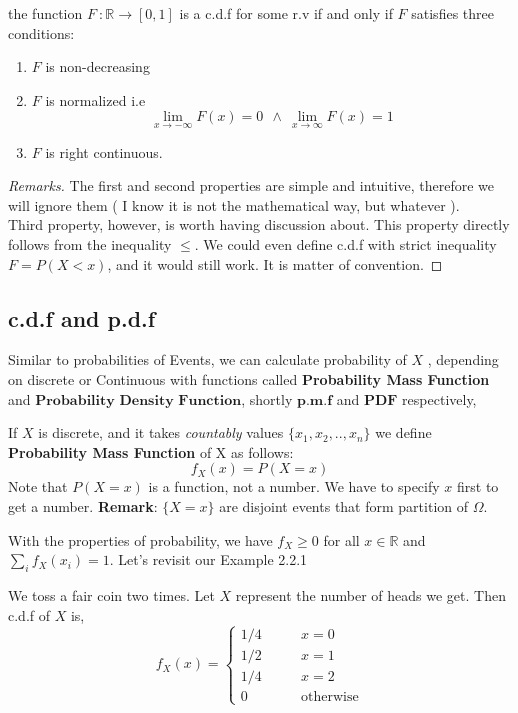 \begin{theorem}
    the function $F \ : \mathbb{R} \rightarrow [0,1]$ is a c.d.f for some r.v if and only if $F$ satisfies three conditions:
    \begin{enumerate}
        \item $F$ is non-decreasing
        \item $F$ is normalized i.e \[ \lim_{x \rightarrow -\infty} F(x) = 0\ \ \land \ \lim_{x \rightarrow \infty} F(x) =1 \]
        \item $F$ is right continuous.
    \end{enumerate}
    \begin{proof}[Remarks]
        The first and second properties are simple and intuitive, therefore we will ignore them ( I know it is not the mathematical way, but whatever   ). \\
        
        Third property, however, is worth having discussion about. This property directly follows from the inequality $\le$. We could even define c.d.f with strict inequality $F= P(X<x)$, and it would still work. It is matter of convention.
    \end{proof}
\end{theorem}

\subsection*{c.d.f and p.d.f}
Similar to probabilities of Events, we can calculate probability of $X$ , depending on discrete or Continuous with functions called \textbf{ Probability Mass Function} and $\textbf{Probability Density Function}$, shortly $\textbf{p.m.f}$ and $\textbf{PDF}$ respectively,

\begin{definition}
    If $X$ is discrete, and it takes \textit{countably} values $ \{ x_1,x_2,..,
    x_n \}$ we define \textbf{Probability Mass Function} of X as follows:
    $$f_X(x)= P(X = x)$$
    Note that $P(X = x)$ is a function, not a number. We have to specify $x$ first to get a number.
    \textbf{Remark}: $ \{ X=x \} $ are disjoint events that form partition of $\Omega$.
\end{definition}

   With the properties of probability, we have $f_X \ge 0$ for all $x \in \mathbb{R}$ and $\sum_{i} f_X (x_i) =1 $. Let's revisit our Example 2.2.1

   \begin{example}
    We toss a fair coin two times. Let $X$ represent the number of heads we get. Then c.d.f of $X$ is,
    \[f_X(x) = 
        \begin{cases} 
          1/4 \qquad &x=0\\
          1/2 \qquad &x=1 \\
          1/4 \qquad &x=2\\
          0 \qquad &\text{otherwise}
        \end{cases} 
\]
\end{example}



